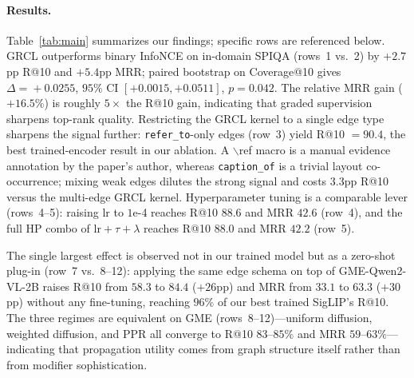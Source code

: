 \documentclass{article}
\begin{document}
\paragraph{Results.}
Table~\ref{tab:main} summarizes our findings; specific rows are
referenced below.
GRCL outperforms binary InfoNCE on in-domain SPIQA (rows~1 vs.~2) by
$+2.7$pp R@10 and $+5.4$pp MRR; paired bootstrap on Coverage@10 gives
$\Delta\!=\!+0.0255$, $95\%$ CI $[+0.0015,+0.0511]$, $p\!=\!0.042$. The
relative MRR gain ($+16.5\%$) is roughly $5\times$ the R@10 gain,
indicating that graded supervision sharpens top-rank quality. Restricting
the GRCL kernel to a single edge type sharpens the signal further:
\texttt{refer\_to}-only edges (row~3) yield R@10 $=\mathbf{90.4}$, the
best trained-encoder result in our ablation. A $\backslash$ref macro
is a manual evidence annotation by the paper's author, whereas
\texttt{caption\_of} is a trivial layout co-occurrence; mixing weak
edges dilutes the strong signal and costs $3.3$pp R@10 versus the
multi-edge GRCL kernel. Hyperparameter tuning is a comparable
lever (rows~4--5): raising $\text{lr}$ to $1$e-4 reaches R@10 $88.6$ and
MRR $42.6$ (row~4), and the full HP combo of $\text{lr}\!+\!\tau\!+\!\lambda$
reaches R@10 $88.0$ and MRR $42.2$ (row~5).

The single largest effect is observed not in our trained model but as a
zero-shot plug-in (row~7 vs.~8--12): applying the same edge schema on
top of GME-Qwen2-VL-2B raises R@10 from $58.3$ to $84.4$ ($+26$pp) and
MRR from $33.1$ to $63.3$ ($+30$pp) without any fine-tuning, reaching
$96\%$ of our best trained SigLIP's R@10. The three regimes are
equivalent on GME (rows~8--12)---uniform diffusion, weighted diffusion,
and PPR all converge to R@10 $83$--$85\%$ and MRR $59$--$63\%$---
indicating that propagation utility comes from graph structure itself
rather than from modifier sophistication.
\end{document}

